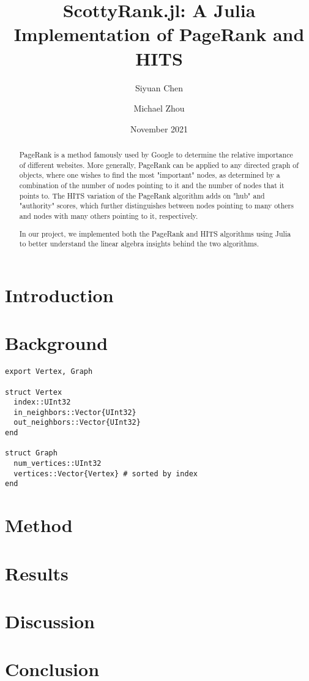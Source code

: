 \documentclass[12pt, titlepage, twoside]{amsart}
\theoremstyle{remark}
\begin{document}
\title[ScottyRank.jl]{ScottyRank.jl: A Julia Implementation of PageRank and HITS}

\author{Siyuan Chen}
\author{Michael Zhou}
\date{November 2021}

\begin{abstract}
PageRank is a method famously used by Google to determine the relative importance of different websites. More generally, PageRank can be applied to any directed graph of objects, where one wishes to find the most "important" nodes, as determined by a combination of the number of nodes pointing to it and the number of nodes that it points to. The HITS variation of the PageRank algorithm adds on "hub" and "authority" scores, which further distinguishes between nodes pointing to many others and nodes with many others pointing to it, respectively.

In our project, we implemented both the PageRank and HITS algorithms using Julia to better understand the linear algebra insights behind the two algorithms.
\end{abstract}

\maketitle

\tableofcontents

\section{Introduction}

\lipsum[1]

\section{Background}

\lipsum[1]

\begin{lstlisting}
export Vertex, Graph

struct Vertex
  index::UInt32
  in_neighbors::Vector{UInt32}
  out_neighbors::Vector{UInt32}
end

struct Graph
  num_vertices::UInt32
  vertices::Vector{Vertex} # sorted by index
end
\end{lstlisting}

\lipsum[1]

\section{Method}

\lipsum[1]

\section{Results}

\lipsum[1]

\section{Discussion}

\lipsum[1]

\section{Conclusion}

\lipsum[1]
\end{document}

